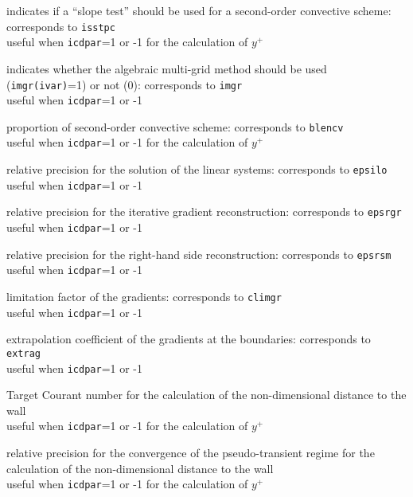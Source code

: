 {indicates if a ``slope test'' should be used for a second-order convective
scheme: corresponds to {\tt isstpc}\\
useful when {\tt icdpar}=1 or -1 for the calculation of $y^+$}

{indicates whether the algebraic
multi-grid method should be used ({\tt imgr(ivar)}=1) or not (0): corresponds
to {\tt imgr}\\
useful when {\tt icdpar}=1 or -1}

{proportion of second-order convective scheme: corresponds to {\tt blencv}\\
useful when {\tt icdpar}=1 or -1 for the calculation of $y^+$}

{relative precision for the solution of the linear systems:
corresponds to {\tt epsilo}\\
useful when {\tt icdpar}=1 or -1}

{relative precision for the iterative gradient reconstruction:
corresponds to {\tt epsrgr}\\
useful when {\tt icdpar}=1 or -1}

{relative precision for the right-hand side reconstruction:
corresponds to {\tt epsrsm}\\
useful when {\tt icdpar}=1 or -1}

{limitation factor of the gradients: corresponds to {\tt climgr}\\
useful when {\tt icdpar}=1 or -1}

{extrapolation coefficient of the gradients at the boundaries:
corresponds to {\tt extrag}\\
useful when {\tt icdpar}=1 or -1}

{Target Courant number for the calculation of the non-dimensional distance
to the wall\\
useful when {\tt icdpar}=1 or -1 for the calculation of $y^+$}

{relative precision for the convergence of the pseudo-transient regime
for the calculation of the non-dimensional distance to the wall\\
useful when {\tt icdpar}=1 or -1  for the calculation of $y^+$}

